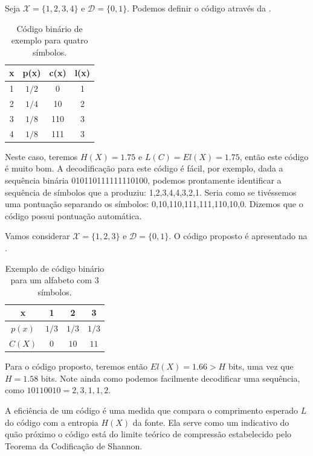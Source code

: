 \begin{example}
  Seja $\mathcal{X} = \{1, 2, 3, 4\}$ e $\mathcal{D} = \{0, 1\}$. Podemos definir
  o código através da .
  \begin{table}[h]
    \centering
    \caption{Código binário de exemplo para quatro símbolos.}\label{tb:excode1}
    \begin{tabular}{c|c|c|c}
      x & p(x)  & c(x) & l(x) \\ \hline
      1 & $1/2$ & 0    & 1    \\
      2 & $1/4$ & 10   & 2    \\
      3 & $1/8$ & 110  & 3    \\
      4 & $1/8$ & 111  & 3    \\
    \end{tabular}
  \end{table}
  Neste caso, teremos $H(X) = 1.75$ e $L(C)=El(X)=1.75$, então este código é muito bom.
  A decodificação para este código é fácil, por exemplo, dada a sequência binária 010110111111110100,
  podemos prontamente identificar a sequência de símbolos que a produziu: 1,2,3,4,4,3,2,1.
  Seria como se tivéssemos uma pontuação separando os símbolos: 0,10,110,111,111,110,10,0.
  Dizemos que o código possui pontuação automática.
\end{example}

\begin{example}
Vamos considerar $\mathcal{X} = \{1,2,3\}$ e $\mathcal{D}=\{0,1\}$.
O código proposto é apresentado na .
\begin{table}[h]
  \centering
  \caption{Exemplo de código binário para um alfabeto com 3 símbolos.}\label{tb:excode2}
   \begin{tabular}{cccc}
   x      &  1    &   2   &   3   \\ \hline
   $p(x)$ & $1/3$ & $1/3$ & $1/3$ \\ \hline
   $C(X)$ & $0$   & $10$  & $11$
   \end{tabular}
\end{table}
Para o código proposto, teremos então $El(X)=1.66 > H$ bits, uma vez que $H = 1.58$ bits.
Note ainda como podemos facilmente decodificar uma sequência, como $10110010 = 2,3,1,1,2$.
\end{example}

A eficiência de um código é uma medida que compara o comprimento esperado $L$
do código com a entropia $H(X)$ da fonte. Ela serve como um indicativo do
quão próximo o código está do limite teórico de
compressão estabelecido pelo Teorema da Codificação de Shannon.

